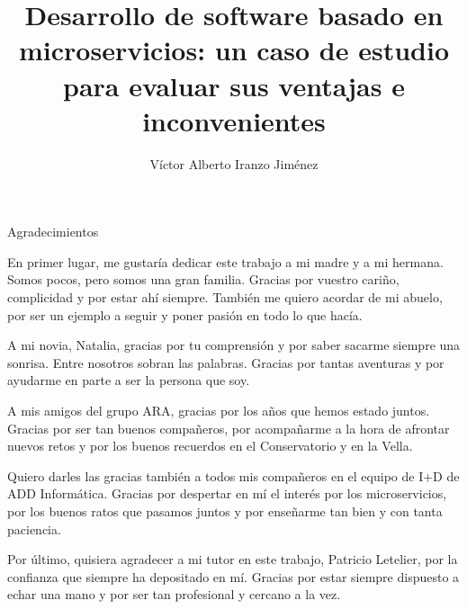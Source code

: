 \documentclass[11pt,spanish,listoffigures]{tfgetsinf}
\title{ Desarrollo de software basado en microservicios: un caso de estudio para evaluar sus ventajas e inconvenientes }
\author{Víctor Alberto Iranzo Jiménez}
\begin{document}
{\Huge Agradecimientos}

\vspace{0.7cm}

En primer lugar, me gustaría dedicar este trabajo a mi madre y a mi hermana. Somos pocos, pero somos una gran familia. Gracias por vuestro cariño, complicidad y por estar ahí siempre. También me quiero acordar de mi abuelo, por ser un ejemplo a seguir y poner pasión en todo lo que hacía.

\vspace{0.4cm}

A mi novia, Natalia, gracias por tu comprensión y por saber sacarme siempre una sonrisa. Entre nosotros sobran las palabras. Gracias por tantas aventuras y por ayudarme en parte a ser la persona que soy.

\vspace{0.4cm}

A mis amigos del grupo ARA, gracias por los años que hemos estado juntos. Gracias por ser tan buenos compañeros, por acompañarme a la hora de afrontar nuevos retos y por los buenos recuerdos en el Conservatorio y en la Vella.

\vspace{0.4cm}

Quiero darles las gracias también a todos mis compañeros en el equipo de I+D de ADD Informática. Gracias por despertar en mí el interés por los microservicios, por los buenos ratos que pasamos juntos y por enseñarme tan bien y con tanta paciencia.

\vspace{0.4cm}

Por último, quisiera agradecer a mi tutor en este trabajo, Patricio Letelier, por la confianza que siempre ha depositado en mí. Gracias por estar siempre dispuesto a echar una mano y por ser tan profesional y cercano a la vez.

\newpage

\end{document}
